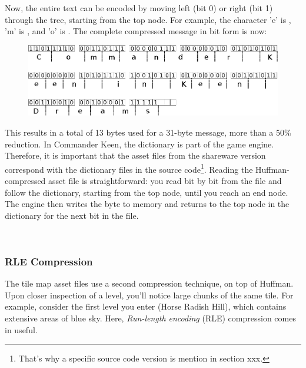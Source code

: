 \documentclass[book.tex]{subfiles}
\begin{document}
 \par
Now, the entire text can be encoded by moving left (bit 0) or right (bit 1) through the tree, starting from the top node. For example, the character 'e' is , 'm' is , and 'o' is . The complete compressed message in bit form is now:\\


\begin{figure}[H]
\centering
 \includegraphics[width=\textwidth]{imgs/drawings/huffman_decode.eps}
 \end{figure}

 \par
This results in a total of 13 bytes used for a 31-byte message, more than a 50\% reduction. In Commander Keen, the dictionary is part of the game engine. Therefore, it is important that the asset files from the shareware version correspond with the dictionary files in the source code\footnote{That's why a specific source code version is mention in section xxx.}. Reading the Huffman-compressed asset file is straightforward: you read bit by bit from the file and follow the dictionary, starting from the top node, until you reach an end node. The engine then writes the byte to memory and returns to the top node in the dictionary for the next bit in the file.\\

\par
\begin{minipage}{\textwidth}
 \par
 \end{minipage}\\

\subsubsection{RLE Compression}
The tile map asset files use a second compression technique, on top of Huffman. Upon closer inspection of a level, you'll notice large chunks of the same tile. For example, consider the first level you enter (Horse Radish Hill), which contains extensive areas of blue sky. Here, \textit{Run-length encoding} (RLE) compression comes in useful.\\
\end{document}
